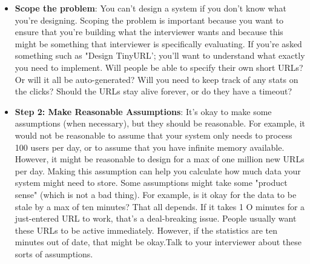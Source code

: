 \documentclass{report}
\begin{document}
\begin{itemize}
\begin{itemize}
                \item \textbf{State your assumptions explicitly:} When you do make assumptions, state them. This allows your inter viewer to correct you if you're mistaken, and shows that you at least know what assumptions you're making.
                \item \textbf{Estimate when necessary:} In many cases, you might not have the data you need. For example, if you're designing a web crawler, you might need to estimate how much space it will take to store all the URLs. You can estimate this with other data you know.
                \item \textbf{Drive:} As the candidate, you should stay in the driver's seat. This doesn't mean you don't talk to your interviewer; in fact you must talk to your interviewer. However, you should be driving through the question. Ask questions. Be open about tradeoffs. Continue to go deeper. Continue to make improvements. These questions are largely about the process rather than the ultimate design.
            \end{itemize}
        \item \textbf{Scope the problem}: You can't design a system if you don't know what you're designing. Scoping the problem is important because you want to ensure that you're building what the interviewer wants and because this might be something that interviewer is specifically evaluating.
            \bigbreak \noindent 
            If you're asked something such as "Design TinyURL'; you'll want to understand what exactly you need to implement. Will people be able to specify their own short URLs? Or will it all be auto-generated? Will you need to keep track of any stats on the clicks? Should the URLs stay alive forever, or do they have a timeout?
        \item \textbf{Step 2: Make Reasonable Assumptions}: It's okay to make some assumptions (when necessary), but they should be reasonable. For example, it would not be reasonable to assume that your system only needs to process 100 users per day, or to assume that you have infinite memory available.
            \bigbreak \noindent 
            However, it might be reasonable to design for a max of one million new URLs per day. Making this assumption can help you calculate how much data your system might need to store.
            \bigbreak \noindent 
            Some assumptions might take some "product sense" (which is not a bad thing). For example, is it okay for the data to be stale by a max of ten minutes? That all depends. If it takes 1 O minutes for a just-entered URL to work, that's a deal-breaking issue. People usually want these URLs to be active immediately. However, if the statistics are ten minutes out of date, that might be okay.Talk to your interviewer about these sorts of assumptions.

\end{itemize}
\end{document}
